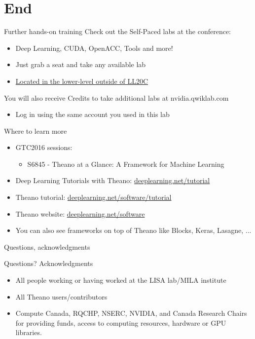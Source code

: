 \documentclass[utf8x,xcolor=pdftex,dvipsnames,table]{beamer}
\begin{document}
\section{End}
\begin{frame}{Further hands-on training}
Check out the Self-Paced labs at the conference:
\begin{itemize}
  \item Deep Learning, CUDA, OpenACC, Tools and more!
  \item Just grab a seat and take any available lab
  \item \underline{Located in the lower-level outside of LL20C}\newline
\end{itemize}

You will also receive Credits to take additional labs at nvidia.qwiklab.com
\begin{itemize}
\item Log in using the same account you used in this lab
\end{itemize}
\end{frame}

\begin{frame}{Where to learn more}
\normalsize
\begin{itemize}
\item GTC2016 sessions:
  \begin{itemize}
  \item S6845 - Theano at a Glance: A Framework for Machine Learning
  \end{itemize}
\item Deep Learning Tutorials with Theano: \url{deeplearning.net/tutorial}
\item Theano tutorial: \url{deeplearning.net/software/tutorial}
\item Theano website: \url{deeplearning.net/software}
\item You can also see frameworks on top of Theano like Blocks, Keras, Lasagne, ...
\end{itemize}

\end{frame}

\begin{frame}{Questions, acknowledgments}
\Huge
\begin{center}
Questions?\newline
Acknowledgments
\end{center}
\normalsize
\begin{itemize}
\item All people working or having worked at the LISA lab/MILA institute
\item All Theano users/contributors
\item Compute Canada, RQCHP, NSERC, NVIDIA, and Canada Research Chairs for providing funds, access to computing resources, hardware or GPU libraries.
\end{itemize}

\end{frame}
\end{document}
